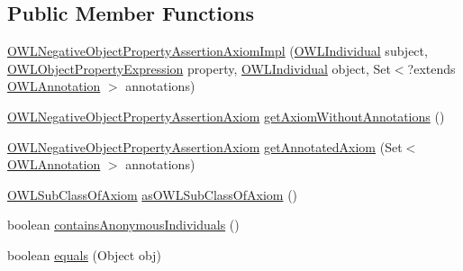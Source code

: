 \subsection*{Public Member Functions}
\begin{DoxyCompactItemize}
\item 
\hyperlink{classuk_1_1ac_1_1manchester_1_1cs_1_1owl_1_1owlapi_1_1_o_w_l_negative_object_property_assertion_axiom_impl_af1f042a91115738bdb210227f9ef3545}{O\-W\-L\-Negative\-Object\-Property\-Assertion\-Axiom\-Impl} (\hyperlink{interfaceorg_1_1semanticweb_1_1owlapi_1_1model_1_1_o_w_l_individual}{O\-W\-L\-Individual} subject, \hyperlink{interfaceorg_1_1semanticweb_1_1owlapi_1_1model_1_1_o_w_l_object_property_expression}{O\-W\-L\-Object\-Property\-Expression} property, \hyperlink{interfaceorg_1_1semanticweb_1_1owlapi_1_1model_1_1_o_w_l_individual}{O\-W\-L\-Individual} object, Set$<$?extends \hyperlink{interfaceorg_1_1semanticweb_1_1owlapi_1_1model_1_1_o_w_l_annotation}{O\-W\-L\-Annotation} $>$ annotations)
\item 
\hyperlink{interfaceorg_1_1semanticweb_1_1owlapi_1_1model_1_1_o_w_l_negative_object_property_assertion_axiom}{O\-W\-L\-Negative\-Object\-Property\-Assertion\-Axiom} \hyperlink{classuk_1_1ac_1_1manchester_1_1cs_1_1owl_1_1owlapi_1_1_o_w_l_negative_object_property_assertion_axiom_impl_a76de6f08f31598cb8e0962515c3e753f}{get\-Axiom\-Without\-Annotations} ()
\item 
\hyperlink{interfaceorg_1_1semanticweb_1_1owlapi_1_1model_1_1_o_w_l_negative_object_property_assertion_axiom}{O\-W\-L\-Negative\-Object\-Property\-Assertion\-Axiom} \hyperlink{classuk_1_1ac_1_1manchester_1_1cs_1_1owl_1_1owlapi_1_1_o_w_l_negative_object_property_assertion_axiom_impl_ab3fe390d42bb78171e04f70fa10dd6f8}{get\-Annotated\-Axiom} (Set$<$ \hyperlink{interfaceorg_1_1semanticweb_1_1owlapi_1_1model_1_1_o_w_l_annotation}{O\-W\-L\-Annotation} $>$ annotations)
\item 
\hyperlink{interfaceorg_1_1semanticweb_1_1owlapi_1_1model_1_1_o_w_l_sub_class_of_axiom}{O\-W\-L\-Sub\-Class\-Of\-Axiom} \hyperlink{classuk_1_1ac_1_1manchester_1_1cs_1_1owl_1_1owlapi_1_1_o_w_l_negative_object_property_assertion_axiom_impl_a425190648b24adc25b57517f20a7d458}{as\-O\-W\-L\-Sub\-Class\-Of\-Axiom} ()
\item 
boolean \hyperlink{classuk_1_1ac_1_1manchester_1_1cs_1_1owl_1_1owlapi_1_1_o_w_l_negative_object_property_assertion_axiom_impl_a8468efdfb9cc180a601045d0e47aadfc}{contains\-Anonymous\-Individuals} ()
\item 
boolean \hyperlink{classuk_1_1ac_1_1manchester_1_1cs_1_1owl_1_1owlapi_1_1_o_w_l_negative_object_property_assertion_axiom_impl_ae28e7fb7e4b198044c772dab9bf2b37d}{equals} (Object obj)

\end{DoxyCompactItemize}
